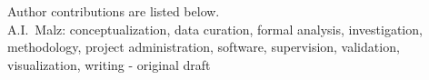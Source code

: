 Author contributions are listed below. \\
A.I.~Malz: conceptualization, data curation, formal analysis, investigation, methodology, project administration, software, supervision, validation, visualization, writing - original draft \\
